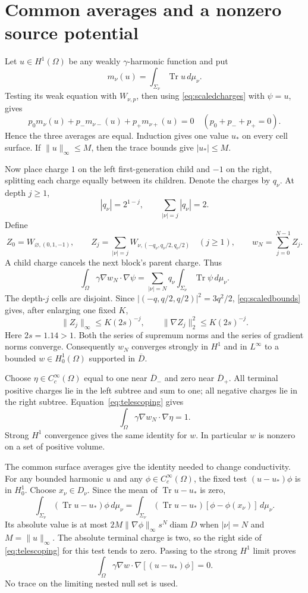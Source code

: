 \documentclass[10pt]{article}
\newcommand{\Tr}{\operatorname{Tr}}
\begin{document}
\section{Common averages and a nonzero source potential}
Let $u\in H^1(\Omega)$ be any weakly $\gamma$-harmonic function and put
\[
m_\nu(u)=\int_{\Sigma_\nu}\Tr u\,d\mu_\nu.
\]
Testing its weak equation with $W_{\nu,p}$, then using \eqref{eq:scaledcharges} with $\psi=u$, gives
\[
p_0m_\nu(u)+p_-m_{\nu-}(u)+p_+m_{\nu+}(u)=0
\quad(p_0+p_-+p_+=0).
\]
Hence the three averages are equal. Induction gives one value $u_*$ on every cell surface. If $\|u\|_\infty\leq M$, then the trace bounds give $|u_*|\leq M$.

Now place charge $1$ on the left first-generation child and $-1$ on the right, splitting each charge equally between its children. Denote the charges by $q_\nu$. At depth $j\geq1$,
\[
|q_\nu|=2^{1-j},\qquad \sum_{|\nu|=j}|q_\nu|=2.
\]
Define
\[
Z_0=W_{\varnothing,(0,1,-1)},\qquad
Z_j=\sum_{|\nu|=j}W_{\nu,(-q_\nu,q_\nu/2,q_\nu/2)}\quad(j\geq1),
\qquad w_N=\sum_{j=0}^{N-1}Z_j.
\]
A child charge cancels the next block's parent charge. Thus
\begin{equation}\label{eq:telescoping}
\int_\Omega\gamma\nabla w_N\cdot\nabla\psi
=\sum_{|\nu|=N}q_\nu\int_{\Sigma_\nu}\Tr\psi\,d\mu_\nu.
\end{equation}
The depth-$j$ cells are disjoint. Since $|(-q,q/2,q/2)|^2=3q^2/2$, \eqref{eq:scaledbounds} gives, after enlarging one fixed $K$,
\[
\|Z_j\|_\infty\leq K(2s)^{-j},\qquad
\|\nabla Z_j\|_2^2\leq K(2s)^{-j}.
\]
Here $2s=1.14>1$. Both the series of supremum norms and the series of gradient norms converge. Consequently $w_N$ converges strongly in $H^1$ and in $L^\infty$ to a bounded $w\in H^1_0(\Omega)$ supported in $\overline D$.

Choose $\eta\in C^\infty_c(\Omega)$ equal to one near $\overline D_-$ and zero near $\overline D_+$. All terminal positive charges lie in the left subtree and sum to one; all negative charges lie in the right subtree. Equation~\eqref{eq:telescoping} gives
\[
\int_\Omega\gamma\nabla w_N\cdot\nabla\eta=1.
\]
Strong $H^1$ convergence gives the same identity for $w$. In particular $w$ is nonzero on a set of positive volume.

The common surface averages give the identity needed to change conductivity. For any bounded harmonic $u$ and any $\phi\in C^\infty_c(\Omega)$, the fixed test $(u-u_*)\phi$ is in $H^1_0$. Choose $x_\nu\in D_\nu$. Since the mean of $\Tr u-u_*$ is zero,
\[
\int_{\Sigma_\nu}(\Tr u-u_*)\phi\,d\mu_\nu
=\int_{\Sigma_\nu}(\Tr u-u_*)[\phi-\phi(x_\nu)]\,d\mu_\nu.
\]
Its absolute value is at most $2M\|\nabla\phi\|_\infty s^N\operatorname{diam}D$ when $|\nu|=N$ and $M=\|u\|_\infty$. The absolute terminal charge is two, so the right side of \eqref{eq:telescoping} for this test tends to zero. Passing to the strong $H^1$ limit proves
\begin{equation}\label{eq:annihilation}
\int_\Omega\gamma\nabla w\cdot\nabla[(u-u_*)\phi]=0.
\end{equation}
No trace on the limiting nested null set is used.
\end{document}
